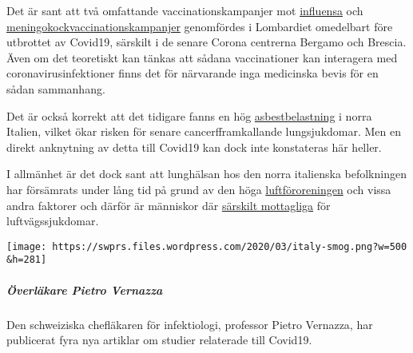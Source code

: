 Det är sant att två omfattande vaccinationskampanjer mot
\href{https://www.bergamonews.it/2019/10/21/vaccinazione-antinfluenzale-a-bergamo-ordinate-185-000-dosi-di-vaccino/332164/}{influensa}
och
\href{https://www.bsnews.it/2020/01/18/meningite-vaccinate-34mila-persone-tra-brescia-e-bergamo/}{meningokockvaccinationskampanjer}
genomfördes i Lombardiet omedelbart före utbrottet av Covid19, särskilt
i de senare Corona centrerna Bergamo och Brescia. Även om det teoretiskt
kan tänkas att sådana vaccinationer kan interagera med
coronavirusinfektioner finns det för närvarande inga medicinska bevis
för en sådan sammanhang.

Det är också korrekt att det tidigare fanns en hög
\href{https://www.spiegel.de/panorama/justiz/asbest-prozess-in-italien-nun-sind-alle-krank-a-666421.html}{asbestbelastning}
i norra Italien, vilket ökar risken för senare cancerfframkallande
lungsjukdomar. Men en direkt anknytning av detta till Covid19 kan dock
inte konstateras här heller.

I allmänhet är det dock sant att lunghälsan hos den norra italienska
befolkningen har försämrats under lång tid på grund av den höga
\href{https://www.heise.de/tp/features/Feinstaubpartikel-als-Viren-Vehikel-4687454.html}{luftföroreningen}
och vissa andra faktorer och därför är människor där
\href{https://www.srf.ch/news/international/massive-schadstoffbelastung-nirgendwo-erkranken-so-viele-wegen-smog-wie-in-norditalien}{särskilt
mottagliga} för luftvägssjukdomar.

\texttt{[image: https://swprs.files.wordpress.com/2020/03/italy-smog.png?w=500\\\&h=281]}

\hypertarget{uxf6verluxe4kare-pietro-vernazza}{%
\subparagraph{\texorpdfstring{\textbf{Överläkare Pietro
Vernazza}}{Överläkare Pietro Vernazza}}\label{uxf6verluxe4kare-pietro-vernazza}}

Den schweiziska chefläkaren för infektiologi, professor Pietro Vernazza,
har publicerat fyra nya artiklar om studier relaterade till Covid19.

